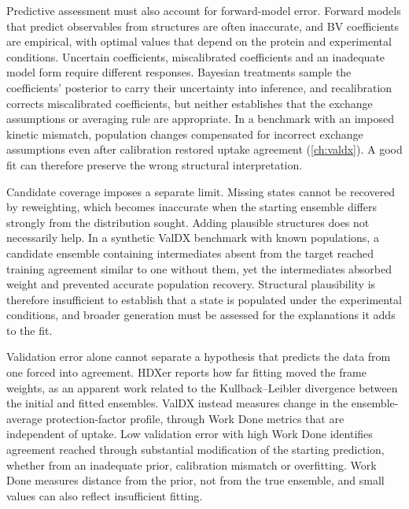 Predictive assessment must also account for forward-model error. Forward models that predict observables from structures are often inaccurate,\supercite{bonomiPrinciplesProteinStructural2017} and BV coefficients are empirical, with optimal values that depend on the protein and experimental conditions.\supercite{bradshawInterpretationHDXData2020} Uncertain coefficients, miscalibrated coefficients and an inadequate model form require different responses. Bayesian treatments sample the coefficients' posterior to carry their uncertainty into inference,\supercite{wanReconcilingSimulatedEnsembles2020} and recalibration corrects miscalibrated coefficients, but neither establishes that the exchange assumptions or averaging rule are appropriate. In a benchmark with an imposed kinetic mismatch, population changes compensated for incorrect exchange assumptions even after calibration restored uptake agreement (\cref{ch:valdx}). A good fit can therefore preserve the wrong structural interpretation.

Candidate coverage imposes a separate limit. Missing states cannot be recovered by reweighting, which becomes inaccurate when the starting ensemble differs strongly from the distribution sought.\supercite{bonomiPrinciplesProteinStructural2017} Adding plausible structures does not necessarily help. In a synthetic ValDX benchmark with known populations, a candidate ensemble containing intermediates absent from the target reached training agreement similar to one without them, yet the intermediates absorbed weight and prevented accurate population recovery.\supercite{siddiquiFrameworkTestingStructural2026} Structural plausibility is therefore insufficient to establish that a state is populated under the experimental conditions, and broader generation must be assessed for the explanations it adds to the fit.

Validation error alone cannot separate a hypothesis that predicts the data from one forced into agreement. HDXer reports how far fitting moved the frame weights, as an apparent work related to the Kullback--Leibler divergence between the initial and fitted ensembles.\supercite{bradshawInterpretationHDXData2020} ValDX instead measures change in the ensemble-average protection-factor profile, through Work Done metrics that are independent of uptake.\supercite{siddiquiFrameworkTestingStructural2026} Low validation error with high Work Done identifies agreement reached through substantial modification of the starting prediction, whether from an inadequate prior, calibration mismatch or overfitting. Work Done measures distance from the prior, not from the true ensemble, and small values can also reflect insufficient fitting.

